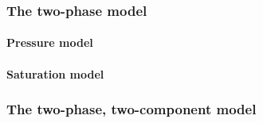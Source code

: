 \subsubsection{The two-phase model}\label{ch:2p_decoupled}

\paragraph{Pressure model}


\paragraph{Saturation model}


\subsubsection{The two-phase, two-component model}\label{ch:2p2c_decoupled}




